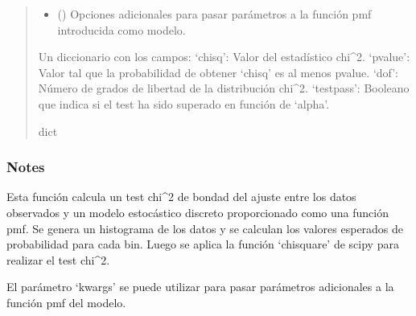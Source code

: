 \documentclass[letterpaper,10pt,english]{sphinxmanual}
\begin{document}
\begin{fulllineitems}
\begin{quote}
\begin{description}
\begin{itemize}
\item {} 
\sphinxAtStartPar
{} () \textendash{} Opciones adicionales para pasar parámetros a la función pmf introducida como modelo.

\end{itemize}

\sphinxAtStartPar
Un diccionario con los campos:
\sphinxhyphen{} ‘chisq’: Valor del estadístico chi\textasciicircum{}2.
\sphinxhyphen{} ‘pvalue’: Valor tal que la probabilidad de obtener ‘chisq’ es al menos pvalue.
\sphinxhyphen{} ‘dof’: Número de grados de libertad de la distribución chi\textasciicircum{}2.
\sphinxhyphen{} ‘testpass’: Booleano que indica si el test ha sido superado en función de ‘alpha’.

\sphinxAtStartPar
dict

\end{description}\end{quote}
\subsubsection*{Notes}

\sphinxAtStartPar
Esta función calcula un test chi\textasciicircum{}2 de bondad del ajuste entre los datos observados y un modelo
estocástico discreto proporcionado como una función pmf. Se genera un histograma de los datos
y se calculan los valores esperados de probabilidad para cada bin. Luego se aplica la función
‘chisquare’ de scipy para realizar el test chi\textasciicircum{}2.

\sphinxAtStartPar
El parámetro ‘kwargs’ se puede utilizar para pasar parámetros adicionales a la función pmf del modelo.

\end{fulllineitems}

\end{document}

